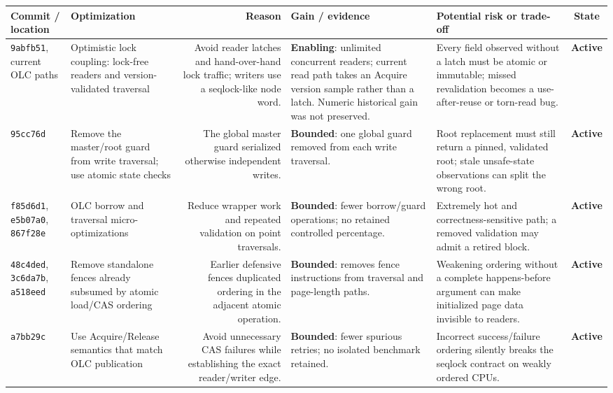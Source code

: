 \documentclass[10pt,a4paper,landscape]{article}
\newcommand{\code}[1]{\texttt{#1}}
\newcommand{\commit}[1]{\code{#1}}
\newcommand{\gainbounded}{\textbf{Bounded}}
\newcommand{\gainenabling}{\textbf{Enabling}}
\newcommand{\stateactive}{\textbf{Active}}
\begin{document}
\begin{longtable}{IORGKS}
\toprule
\textbf{Commit / location} & \textbf{Optimization} & \textbf{Reason} &
\textbf{Gain / evidence} & \textbf{Potential risk or trade-off} & \textbf{State} \\
\midrule
\endhead
\commit{9abfb51}, current OLC paths & Optimistic lock coupling: lock-free readers and
version-validated traversal & Avoid reader latches and hand-over-hand lock traffic;
writers use a seqlock-like node word. & \gainenabling: unlimited concurrent readers; current
read path takes an Acquire version sample rather than a latch. Numeric historical gain
was not preserved. & Every field observed without a latch must be atomic or immutable;
missed revalidation becomes a use-after-reuse or torn-read bug. & \stateactive \\

\commit{95cc76d} & Remove the master/root guard from write traversal; use atomic state
checks & The global master guard serialized otherwise independent writes. & \gainbounded:
one global guard removed from each write traversal. & Root replacement must still return
a pinned, validated root; stale unsafe-state observations can split the wrong root. &
\stateactive \\

\commit{f85d6d1}, \commit{e5b07a0}, \commit{867f28e} & OLC borrow and traversal
micro-optimizations & Reduce wrapper work and repeated validation on point traversals. &
\gainbounded: fewer borrow/guard operations; no retained controlled percentage. & Extremely
hot and correctness-sensitive path; a removed validation may admit a retired block. &
\stateactive \\

\commit{48c4ded}, \commit{3c6da7b}, \commit{a518eed} & Remove standalone fences already
subsumed by atomic load/CAS ordering & Earlier defensive fences duplicated ordering in
the adjacent atomic operation. & \gainbounded: removes fence instructions from traversal and
page-length paths. & Weakening ordering without a complete happens-before argument can
make initialized page data invisible to readers. & \stateactive \\

\commit{a7bb29c} & Use Acquire/Release semantics that match OLC publication & Avoid
unnecessary CAS failures while establishing the exact reader/writer edge. & \gainbounded:
fewer spurious retries; no isolated benchmark retained. & Incorrect success/failure
ordering silently breaks the seqlock contract on weakly ordered CPUs. & \stateactive \\


\end{longtable}
\end{document}
